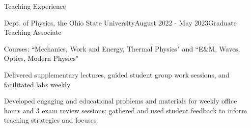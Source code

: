 \documentclass{resume} %
\begin{document}

\begin{rSection}{Teaching Experience}

\begin{rSubsection}{Dept. of Physics, the Ohio State University}{August 2022 - May 2023}{Graduate Teaching Associate}{}
\item Courses: ``Mechanics, Work and Energy, Thermal Physics" and ``E\&M, Waves, Optics, Modern Physics"
\item Delivered supplementary lectures, guided student group work sessions, and facilitated labs weekly
\item Developed engaging and educational problems and materials for weekly office hours and 3 exam review sessions; gathered and used student feedback to inform teaching strategies and focuses
\end{rSubsection}

\end{rSection}



\end{document}
